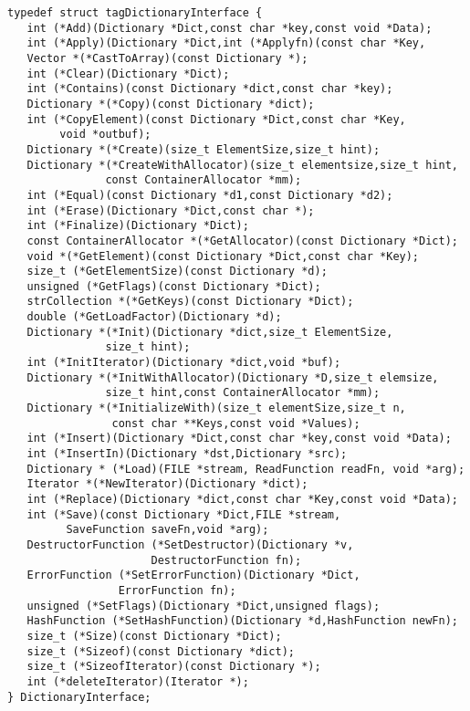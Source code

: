 \begin{verbatim}
typedef struct tagDictionaryInterface {
   int (*Add)(Dictionary *Dict,const char *key,const void *Data);
   int (*Apply)(Dictionary *Dict,int (*Applyfn)(const char *Key,
   Vector *(*CastToArray)(const Dictionary *);
   int (*Clear)(Dictionary *Dict);
   int (*Contains)(const Dictionary *dict,const char *key);
   Dictionary *(*Copy)(const Dictionary *dict);
   int (*CopyElement)(const Dictionary *Dict,const char *Key,
        void *outbuf);
   Dictionary *(*Create)(size_t ElementSize,size_t hint);
   Dictionary *(*CreateWithAllocator)(size_t elementsize,size_t hint,
               const ContainerAllocator *mm);
   int (*Equal)(const Dictionary *d1,const Dictionary *d2);
   int (*Erase)(Dictionary *Dict,const char *);
   int (*Finalize)(Dictionary *Dict);
   const ContainerAllocator *(*GetAllocator)(const Dictionary *Dict);
   void *(*GetElement)(const Dictionary *Dict,const char *Key);
   size_t (*GetElementSize)(const Dictionary *d);
   unsigned (*GetFlags)(const Dictionary *Dict);
   strCollection *(*GetKeys)(const Dictionary *Dict);
   double (*GetLoadFactor)(Dictionary *d);
   Dictionary *(*Init)(Dictionary *dict,size_t ElementSize,
               size_t hint);
   int (*InitIterator)(Dictionary *dict,void *buf);
   Dictionary *(*InitWithAllocator)(Dictionary *D,size_t elemsize,
               size_t hint,const ContainerAllocator *mm);
   Dictionary *(*InitializeWith)(size_t elementSize,size_t n,
                const char **Keys,const void *Values);
   int (*Insert)(Dictionary *Dict,const char *key,const void *Data);
   int (*InsertIn)(Dictionary *dst,Dictionary *src);
   Dictionary * (*Load)(FILE *stream, ReadFunction readFn, void *arg);
   Iterator *(*NewIterator)(Dictionary *dict);
   int (*Replace)(Dictionary *dict,const char *Key,const void *Data);
   int (*Save)(const Dictionary *Dict,FILE *stream,
         SaveFunction saveFn,void *arg);
   DestructorFunction (*SetDestructor)(Dictionary *v,
                      DestructorFunction fn);
   ErrorFunction (*SetErrorFunction)(Dictionary *Dict,
                 ErrorFunction fn);
   unsigned (*SetFlags)(Dictionary *Dict,unsigned flags);
   HashFunction (*SetHashFunction)(Dictionary *d,HashFunction newFn);
   size_t (*Size)(const Dictionary *Dict);
   size_t (*Sizeof)(const Dictionary *dict);
   size_t (*SizeofIterator)(const Dictionary *);
   int (*deleteIterator)(Iterator *);
} DictionaryInterface;
\end{verbatim}

